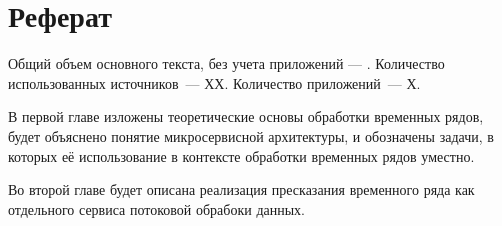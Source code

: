 \chapter*{Реферат}
\thispagestyle{plain}

Общий объем основного текста, без учета приложений ---
\pageref{end_of_main_text}.
Количество использованных источников~--- ХХ.
Количество приложений~--- Х.



В первой главе изложены теоретические основы обработки временных рядов, будет объяснено понятие микросервисной архитектуры, и обозначены задачи, в которых её использование в контексте обработки временных рядов уместно. 

Во второй главе будет описана реализация пресказания временного ряда как отдельного сервиса потоковой обрабоки данных. 





